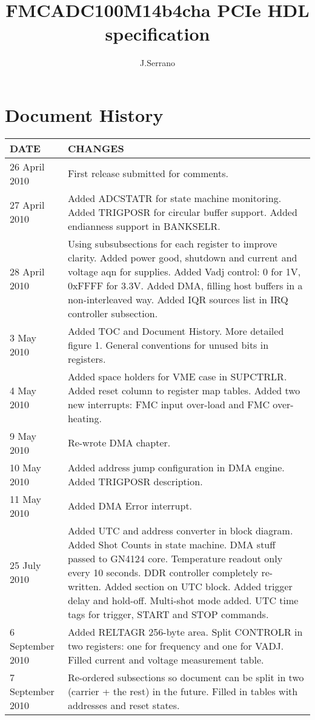 \documentclass{article}
\title{FMCADC100M14b4cha PCIe HDL specification}
\author{J.Serrano}
\begin{document}
\maketitle
\pagebreak

\section*{Document History}
\begin{table}[htbp]
  \centering
  \begin{tabularx}{\textwidth}{|l|X|}
    \hline
    \textbf{DATE} & \textbf{CHANGES} \\
    \hline
    \hline
    26 April 2010 & First release submitted for comments.\\
    \hline
    27 April 2010 & Added ADCSTATR for state machine monitoring. Added TRIGPOSR for circular buffer support. Added endianness support in BANKSELR.\\
    \hline
    28 April 2010 & Using subsubsections for each register to improve clarity. Added power good, shutdown and current and voltage aqn for supplies. Added Vadj control: 0 for 1V, 0xFFFF for 3.3V. Added DMA, filling host buffers in a non-interleaved way. Added IQR sources list in IRQ controller subsection.\\
    \hline
    3 May 2010 & Added TOC and Document History. More detailed figure 1. General conventions for unused bits in registers. \\ 
    \hline
    4 May 2010 & Added space holders for VME case in SUPCTRLR. Added reset column to register map tables. Added two new interrupts: FMC input over-load and FMC over-heating.\\
    \hline
    9 May 2010 & Re-wrote DMA chapter.\\
    \hline
    10 May 2010 & Added address jump configuration in DMA engine. Added TRIGPOSR description.\\
    \hline
    11 May 2010 & Added DMA Error interrupt.\\
    \hline
    25 July 2010 & Added UTC and address converter in block diagram. Added Shot Counts in state machine. DMA stuff passed to GN4124 core. Temperature readout only every 10 seconds. DDR controller completely re-written. Added section on UTC block. Added trigger delay and hold-off. Multi-shot mode added. UTC time tags for trigger, START and STOP commands.\\
    \hline
    6 September 2010 & Added RELTAGR 256-byte area. Split CONTROLR in two registers: one for frequency and one for VADJ. Filled current and voltage measurement table.\\
    \hline
    7 September 2010 & Re-ordered subsections so document can be split in two (carrier + the rest) in the future. Filled in tables with addresses and reset states.\\
    \hline
  \end{tabularx}
\end{table}
\end{document}
